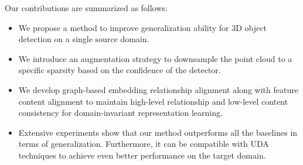 Our contributions are summarized as follows:
\begin{itemize}
  \item We propose a method to improve generalization ability for 3D object detection on a single source domain.
  \item We introduce an augmentation strategy to downsample the point cloud to a specific sparsity based on the confidence of the detector.
  \item We develop graph-based embedding relationship alignment along with feature content alignment to maintain high-level relationship and low-level content consistency for domain-invariant representation learning.
  \item Extensive experiments show that our method outperforms all the baselines in terms of generalization. Furthermore, it can be compatible with UDA techniques to achieve even better performance on the target domain.
\end{itemize}

\begin{table}[t]
    \scriptsize
    \centering

    \caption{Datasets overview. The dataset size refers to the total number of annotated frames.}

    \label{dataset_overview}
\end{table}